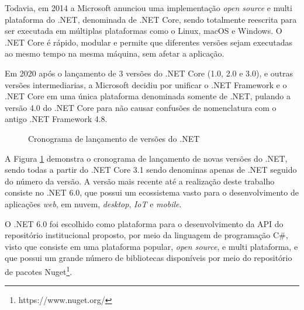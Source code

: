 Todavia, em 2014 a Microsoft anunciou uma implementação \emph{open source} e
multi plataforma do .NET, denominada de .NET Core, sendo totalmente reescrita
para ser executada em múltiplas plataformas como o Linux, macOS e Windows.
O .NET Core é rápido, modular e permite que diferentes versões sejam
executadas ao mesmo tempo na mesma máquina, sem afetar a aplicação.

Em 2020 após o lançamento de 3 versões do .NET Core (1.0, 2.0 e 3.0), e outras
versões intermediarias, a Microsoft decidiu por unificar o .NET Framework e o
.NET Core em uma única plataforma denominada somente de .NET, pulando a
versão 4.0 do .NET Core para não causar confusões de nomenclatura
com o antigo .NET Framework 4.8.

\begin{figure}[H]
    \caption{Cronograma de lançamento de versões do .NET}
    \centering
    \label{fig:dotnet-release-schedule}
\end{figure}

A Figura \ref{fig:dotnet-release-schedule} demonstra o cronograma de lançamento
de novas versões do .NET, sendo todas a partir do .NET Core 3.1 sendo denominas
apenas de .NET seguido do número da versão. A versão mais recente até a
realização deste trabalho consiste no .NET 6.0, que possui um ecossistema
vasto para o desenvolvimento de aplicações \emph{web}, em nuvem, \emph{desktop}, \emph{IoT}
e \emph{mobile}.

O .NET 6.0 foi escolhido como plataforma para o desenvolvimento da API do
repositório institucional proposto, por meio da linguagem de programação C\#,
visto que consiste em uma plataforma popular, \emph{open source}, e multi
plataforma, e que possui um grande número de bibliotecas disponíveis
por meio do repositório de pacotes Nuget\footnote{https://www.nuget.org/}.

